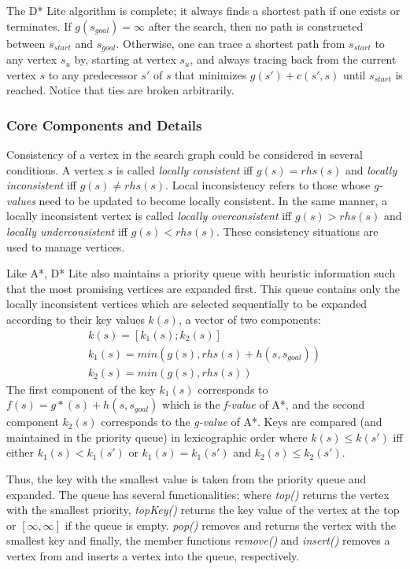 The D* Lite algorithm is complete; it always finds a shortest path if one exists or terminates. If $g(s_{goal}) = \infty$ after the search, then no path is constructed between $s_{start}$ and $s_{goal}$. Otherwise, one can trace a shortest path from $s_{start}$ to any vertex $s_{u}$ by, starting at vertex $s_{u}$, and always tracing back from the current vertex $s$ to any predecessor $s'$ of $s$ that minimizes $g(s') + c(s', s)$ until $s_{start}$ is reached. Notice that ties are broken arbitrarily.

\subsubsection{Core Components and Details}

Consistency of a vertex in the search graph could be considered in several conditions. A vertex $s$ is called \textit{locally consistent} iff $g(s) = rhs(s)$ and \textit{locally inconsistent} iff $g(s) \neq rhs(s)$. Local inconsistency refers to those whose \textit{g-values} need to be updated to become locally consistent. In the same manner, a locally inconsistent vertex is called \textit{locally overconsistent} iff $g(s) > rhs(s)$ and \textit{locally underconsistent} iff $g(s) < rhs(s)$. These consistency situations are used to manage vertices.

Like A*, D* Lite also maintains a priority queue with heuristic information such that the most promising vertices are expanded first. This queue contains only the locally inconsistent vertices which are selected sequentially to be expanded according to their key values $k(s)$, a vector of two components:
\begin{gather*}
k(s) = [k_{1}(s); k_{2}(s)] \\
k_{1}(s) = min(g(s), rhs(s) + h(s, s_{goal})) \\
k_{2}(s) = min(g(s), rhs(s))
\end{gather*}
The first component of the key $k_{1}(s)$ corresponds to $f(s) = g*(s) + h(s, s_{goal})$ which is the \textit{f-value} of A*, and the second component $k_{2}(s)$ corresponds to the \textit{g-value} of A*. Keys are compared (and maintained in the priority queue) in lexicographic order where $k(s) \leq k(s')$ iff either $k_{1}(s) < k_{1}(s')$ or $k_{1}(s) = k_{1}(s')$ and $k_{2}(s) \leq k_{2}(s')$.

Thus, the key with the smallest value is taken from the priority queue and expanded. The queue has several functionalities; where \textit{top()} returns the vertex with the smallest priority, \textit{topKey()} returns the key value of the vertex at the top or $[\infty, \infty]$ if the queue is empty. \textit{pop()} removes and returns the vertex with the smallest key and finally, the member functions \textit{remove()} and \textit{insert()} removes a vertex from and inserts a vertex into the queue, respectively.

